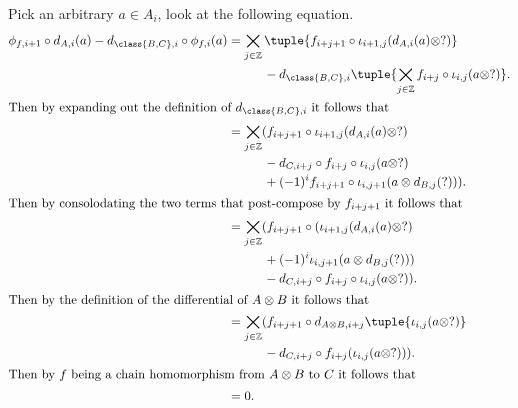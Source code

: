 \begin{remark}
\begin{center}
    \end{center}
    Pick an arbitrary \( a \in A_i \), look at the following equation.
    \begin{align*}
        \phi_{f, i + 1} \circ d_{A, i}(a) - d_{\class{B, C}, i} \circ \phi_{f, i}(a)
        &= \bigtimes_{j \in \Zb} \tuple{ f_{i + j + 1} \circ \iota_{i + 1, j} (d_{A, i}(a) \otimes ?) } \\
        &\hspace{1cm}- d_{\class{B, C}, i} \tuple{ \bigtimes_{j \in \Zb} f_{i + j} \circ \iota_{i, j} (a \otimes ?) }. \\
        \intertext{Then by expanding out the definition of \( d_{\class{B, C}, i} \) it follows that}
        &= \bigtimes_{j \in \Zb} ( f_{i + j + 1} \circ \iota_{i + 1, j} (d_{A, i}(a) \otimes ?) \\
        &\hspace{1cm} - d_{C, i + j} \circ f_{i + j} \circ \iota_{i, j} (a \otimes ?) \\
        &\hspace{1cm} + (-1)^i f_{i + j + 1} \circ \iota_{i, j + 1} (a \otimes d_{B, j}(?)) ). \\
        \intertext{Then by consolodating the two terms that post-compose by \( f_{i + j + 1} \) it follows that}
        &= \bigtimes_{j \in \Zb} ( f_{i + j + 1} \circ ( \iota_{i + 1, j} (d_{A, i}(a) \otimes ?) \\
        &\hspace{1cm} + (-1)^i \iota_{i, j + 1} (a \otimes d_{B, j}(?)) ) \\
        &\hspace{1cm} - d_{C, i + j} \circ f_{i + j} \circ \iota_{i, j} (a \otimes ?) ). \\
        \intertext{Then by the definition of the differential of \( A \otimes B \) it follows that}
        &= \bigtimes_{j \in \Zb} ( f_{i + j + 1} \circ d_{A \otimes B, i + j} \tuple{\iota_{i, j}(a \otimes ?)} \\
        &\hspace{1cm} - d_{C, i + j} \circ f_{i + j} ( \iota_{i, j} (a \otimes ?) ) ). \\
        \intertext{Then by \( f \) being a chain homomorphism from \( A \otimes B \) to \( C \) it follows that}
        &= 0.
    \end{align*}
\end{remark}

